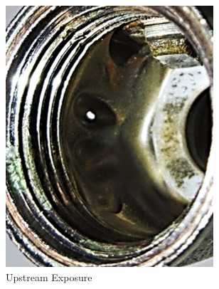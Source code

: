 \documentclass[]{article}
\begin{document}
\begin{figure}[h]
	\centering
	\begin{subfigure}[h]{0.4\textwidth}
		\includegraphics[width=\textwidth]{Photos/Body_sides}
		\caption{Upstream Exposure}
		\label{fig:bodysides}
	\end{subfigure}
	~
	\begin{subfigure}[h]{0.4\textwidth}
		\centering

\end{subfigure}
\end{figure}
\end{document}
